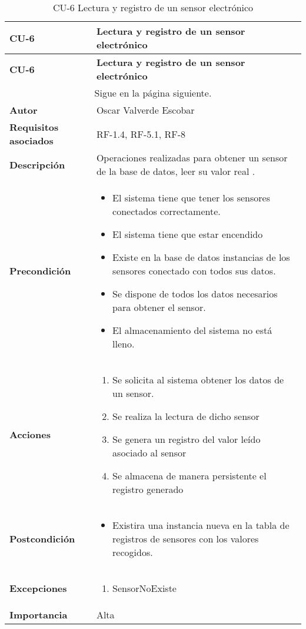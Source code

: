 \begin{longtable}{ p{} p{} }
    \caption{CU-6 Lectura y registro de un sensor electrónico}\\
    \hline
    \textbf{CU-6}    & \textbf{Lectura y registro de un sensor electrónico}\\
    \hline
    \endfirsthead
    \hline
    \textbf{CU-6}    & \textbf{Lectura y registro de un sensor electrónico}\\
    \hline
    \endhead
        \hline
        \multicolumn{2}{c}{Sigue en la página siguiente.}
        \endfoot
        \hline
        \endlastfoot
    \textbf{Versión}              & 1.0    \\
    \textbf{Autor}                & Oscar Valverde Escobar \\
    \textbf{Requisitos asociados} & RF-1.4, RF-5.1, RF-8\\
    \textbf{Descripción}          & Operaciones realizadas para obtener un sensor de la base de datos, leer su valor real .\\
    \textbf{Precondición}         & 
        \begin{itemize}
            \item El sistema tiene que tener los sensores conectados correctamente.
            \item El sistema tiene que estar encendido
            \item Existe en la base de datos instancias de los sensores conectado con todos sus datos. 
            \item Se dispone de todos los datos necesarios para obtener el sensor.
            \item El almacenamiento del sistema no está lleno.
        \end{itemize}\\
    \textbf{Acciones}             &
    \begin{enumerate}
        \def\labelenumi{\arabic{enumi}.}
        \tightlist
        \item Se solicita al sistema obtener los datos de un sensor.
        \item Se realiza la lectura de dicho sensor
        \item Se genera un registro del valor leído asociado al sensor 
        \item Se almacena de manera persistente el registro generado
    \end{enumerate}\\
    \textbf{Postcondición}        &
    \begin{itemize}
            \item Existira una instancia nueva en la tabla de registros de sensores con los valores recogidos.
    \end{itemize}\\
    \textbf{Excepciones}          & 
        \begin{enumerate}
        \item SensorNoExiste
        \end{enumerate} \\
    \textbf{Importancia}          & Alta \\
    \hline
\end{longtable}

